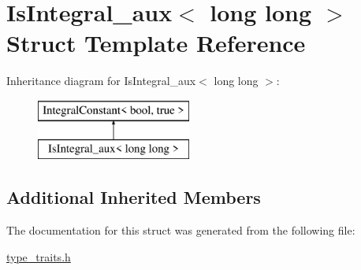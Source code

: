\hypertarget{struct_is_integral__aux_3_01long_01long_01_4}{}\section{Is\+Integral\+\_\+aux$<$ long long $>$ Struct Template Reference}
\label{struct_is_integral__aux_3_01long_01long_01_4}
Inheritance diagram for Is\+Integral\+\_\+aux$<$ long long $>$\+:\begin{figure}[H]
\begin{center}
\leavevmode
\includegraphics[height=2.000000cm]{struct_is_integral__aux_3_01long_01long_01_4}
\end{center}
\end{figure}
\subsection*{Additional Inherited Members}


The documentation for this struct was generated from the following file\+:\begin{DoxyCompactItemize}
\item 
\hyperlink{type__traits_8h}{type\+\_\+traits.\+h}\end{DoxyCompactItemize}
